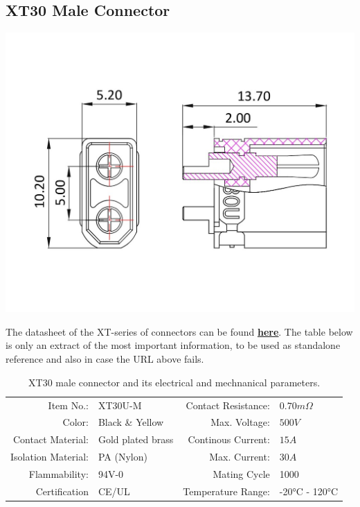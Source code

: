 \clearpage %
    
\subsection{XT30 Male Connector}

\includegraphics[width=\textwidth]{contents/figures/xt30_m.jpg}

The datasheet of the XT-series of connectors can be found \href{https://www.lcsc.com/datasheet/lcsc_datasheet_2304140030_Changzhou-Amass-Elec-XT30U-F_C99101.pdf}{\textbf{\underline{here}}}.
The table below is only an extract of the most important information, to be used as standalone reference and also in case the URL above fails.

\begin{table}[h] %
    \begin{tabular}{rlrl}
         Item No.:&  XT30U-M &  Contact Resistance:& $0.70m \Omega$\\
         Color:&  Black \& Yellow&  Max. Voltage:& $500V$\\
         Contact Material:&  Gold plated brass&  Continous Current:& $15A$\\
         Isolation Material:&  PA (Nylon)&  Max. Current:& $30A$\\
         Flammability:&  94V-0&  Mating Cycle& 1000\\
         Certification&  CE/UL&  Temperature Range:& -20°C - 120°C\\
    \end{tabular}
    \caption{XT30 male connector and its electrical and mechnanical parameters.}
    \label{tab:xt30_m_specs}
\end{table}

